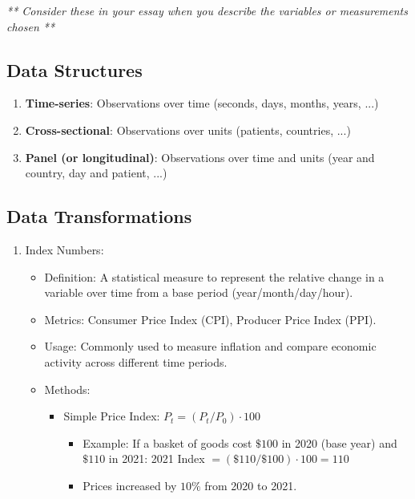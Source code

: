 \documentclass[10pt]{article}
\begin{document}
\begin{enumerate}
\begin{enumerate}
\begin{enumerate}
\begin{center}
  \textit{** Consider these in your essay when you describe the variables or measurements chosen **}
\end{center}

\subsection*{Data Structures}
\begin{enumerate}
  \item \textbf{Time-series}: Observations over time (seconds, days, months, years, ...)
  \item \textbf{Cross-sectional}: Observations over units (patients, countries, ...)
  \item \textbf{Panel (or longitudinal)}: Observations over time and units (year and country, day and patient, ...)
\end{enumerate}

\subsection*{Data Transformations}
\begin{enumerate}
  \item Index Numbers:

    \begin{itemize}
      \item Definition: A statistical measure to represent the relative change in a variable over time from a base period (year/month/day/hour).
      \item Metrics: Consumer Price Index (CPI), Producer Price Index (PPI).
      \item Usage: Commonly used to measure inflation and compare economic activity across different time periods.
      \item Methods:
        \begin{itemize}
          \item Simple Price Index: $P_t = (P_t / P_0) \cdot 100$
          
          \begin{itemize}
            \item Example: If a basket of goods cost $ \$100 $ in 2020 (base year) and $ \$110 $ in 2021: 2021 Index $=(\$ 110 / \$ 100) \cdot 100 = 110$
            \item Prices increased by $ 10\% $ from 2020 to 2021.
          \end{itemize}


\end{itemize}
\end{itemize}
\end{enumerate}
\end{enumerate}
\end{enumerate}
\end{enumerate}
\end{document}
